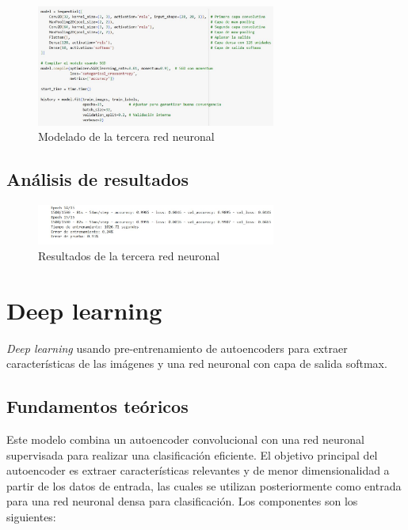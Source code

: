 \begin{figure}[H]
	\centering
	\includegraphics[width=0.7\textwidth]{imgs/model-red3.JPG}
	\caption{Modelado de la tercera red neuronal}
	\label{fig:model-red3}
\end{figure}

\subsection{Análisis de resultados}

\begin{figure}[H]
	\centering
	\includegraphics[width=0.7\textwidth]{imgs/results-red3.JPG}
	\caption{Resultados de la tercera red neuronal}
	\label{fig:results-red3}
\end{figure}


\section{Deep learning}

\textit{Deep learning} usando pre-entrenamiento de autoencoders para extraer características de las imágenes y una red neuronal con capa de salida softmax.

\subsection{Fundamentos teóricos}

Este modelo combina un autoencoder convolucional con una red neuronal supervisada para realizar una clasificación eficiente. El objetivo principal del autoencoder es extraer características relevantes y de menor dimensionalidad a partir de los datos de entrada, las cuales se utilizan posteriormente como entrada para una red neuronal densa para clasificación. Los componentes son los siguientes:

